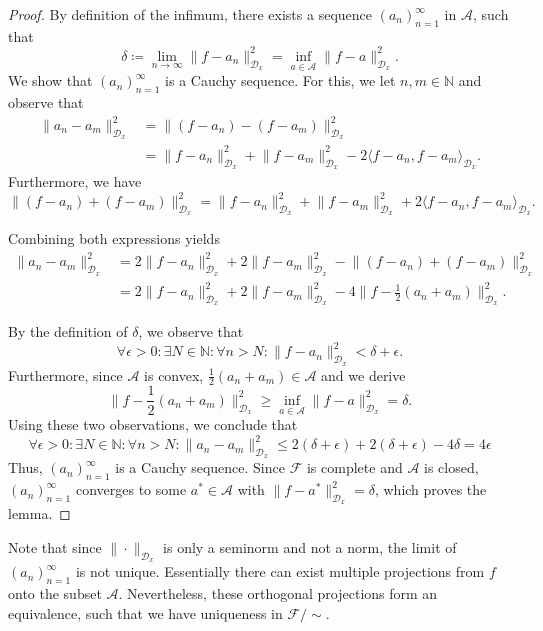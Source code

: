 \documentclass[11pt, a4paper]{article}
\newcommand{\N}{\mathbb{N}}
\newcommand{\A}{\mathcal{A}}
\newcommand{\D}{\mathcal{D}}
\newcommand{\F}{\mathcal{F}}
\begin{document}
\begin{proof}
By definition of the infimum, there exists a sequence $(a_n)_{n=1}^\infty$ in $\A$, such that
\[ \delta \coloneq \lim_{n \to \infty} \big \| f - a_n \big \|_{\D_x}^2 = \inf_{a \in \A} \big \| f - a \big \|_{\D_x}^2 . \]
We show that $(a_n)_{n=1}^\infty$ is a Cauchy sequence. For this, we let $n,m \in \N$ and observe that
\[ \begin{split}
\big \| a_n - a_m \big \|_{\D_x}^2 
&= \big \| (f-a_n) - (f-a_m) \big \|_{\D_x}^2 \\\
&= \big \| f - a_n \big \|_{\D_x}^2 + \big \| f - a_m \big \|_{\D_x}^2 - 2 \big \langle f-a_n, f-a_m \big \rangle_{\D_x}.
\end{split} \]
Furthermore, we have
\[ \big \| (f-a_n) + (f-a_m) \big \|_{\D_x}^2 = \big \| f - a_n \big \|_{\D_x}^2 + \big \| f - a_m \big \|_{\D_x}^2 + 2 \big \langle f-a_n, f-a_m \big \rangle_{\D_x}. \]

Combining both expressions yields
\[ \begin{split}
\big \| a_n - a_m \big \|_{\D_x}^2 
&= 2 \big \| f - a_n \big \|_{\D_x}^2 + 2 \big \| f - a_m \big \|_{\D_x}^2 - \big \| (f-a_n) + (f-a_m) \big \|_{\D_x}^2 \\\
&= 2 \big \| f - a_n \big \|_{\D_x}^2 + 2 \big \| f - a_m \big \|_{\D_x}^2 - 4 \big \| f - \frac{1}{2}(a_n+a_m) \big \|_{\D_x}^2.
\end{split} \]

By the definition of $\delta$, we observe that
\[ \forall \epsilon > 0 : \exists N \in \N : \forall n > N : \big \| f - a_n \big \|_{\D_x}^2 < \delta + \epsilon. \]
Furthermore, since $\A$ is convex, $\frac{1}{2}(a_n + a_m) \in \A$ and we derive
\[ \big \| f - \frac{1}{2}(a_n+a_m) \big \|_{\D_x}^2 \geq \inf_{a \in \A} \big \| f - a \big \|_{\D_x}^2 = \delta. \]
Using these two observations, we conclude that
\[ \forall \epsilon > 0 : \exists N \in \N : \forall n > N : \big \| a_n - a_m \big \|_{\D_x}^2 \leq 2(\delta + \epsilon) + 2(\delta + \epsilon) - 4\delta = 4\epsilon \]
Thus, $(a_n)_{n=1}^\infty$ is a Cauchy sequence. Since $\F$ is complete and $\A$ is closed, $(a_n)_{n=1}^\infty$ converges to some $a^* \in \A$ with $\big \| f - a^* \big \|_{\D_x}^2 = \delta$, which proves the lemma.
\end{proof}

Note that since $\| \cdot \|_{\D_x}$ is only a seminorm and not a norm, the limit of $(a_n)_{n=1}^\infty$ is not unique. Essentially there can exist multiple projections from $f$ onto the subset $\A$. Nevertheless, these orthogonal projections form an equivalence, such that we have uniqueness in $\F/{\sim}$. \\
\end{document}
